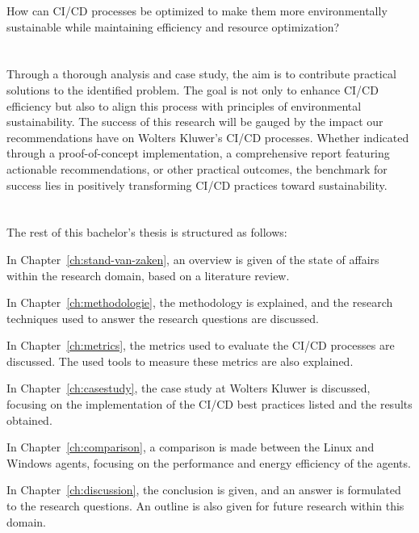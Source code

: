 How can CI/CD processes be optimized to make them more environmentally sustainable while maintaining efficiency
and resource optimization?


\section{}%
\label{sec:onderzoeksdoelstelling}

Through a thorough analysis and case study, the aim is to contribute practical solutions to the identified problem.
The goal is not only to enhance CI/CD efficiency but also to align this process with principles of environmental sustainability.
The success of this research will be gauged by the impact our recommendations have on Wolters Kluwer's CI/CD processes. 
Whether indicated through a proof-of-concept implementation, a comprehensive report featuring actionable recommendations, or other practical outcomes, the benchmark for success lies in positively transforming CI/CD practices toward sustainability.


\section{}%
\label{sec:opzet-bachelorproef}


The rest of this bachelor's thesis is structured as follows:

In Chapter~\ref{ch:stand-van-zaken}, an overview is given of the state of affairs within the research domain, based on a literature review.

In Chapter~\ref{ch:methodologie}, the methodology is explained, and the research techniques used to answer the research questions are discussed.

In Chapter~\ref{ch:metrics}, the metrics used to evaluate the CI/CD processes are discussed. The used tools to measure these metrics are also explained.

In Chapter~\ref{ch:casestudy}, the case study at Wolters Kluwer is discussed, focusing on the implementation of the CI/CD best practices listed and the results obtained.

In Chapter~\ref{ch:comparison}, a comparison is made between the Linux and Windows agents, focusing on the performance and energy efficiency of the agents.

In Chapter~\ref{ch:discussion}, the conclusion is given, and an answer is formulated to the research questions. An outline is also given for future research within this domain.